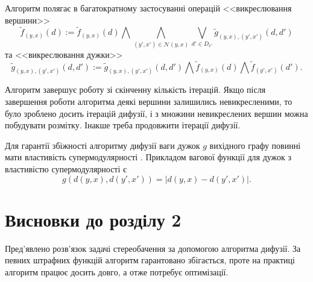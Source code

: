 Алгоритм полягає в багатократному застосуванні операцій
<<викреслювання вершини>>
\begin{equation*}
    \tilde{f}_{\left(y, x \right)} \left(d \right)
    := \tilde{f}_{\left(y, x \right)} \left(d \right)
    \bigwedge \bigwedge \limits_{\left(y', x' \right)\in \mathcal{N}\left(y,x \right)}
        \bigvee \limits_{d' \in D_{x'}}
            \tilde{g}_{\left(y,x \right), \left(y', x' \right)}
                \left(d, d' \right)
\end{equation*}
та <<викреслювання дужки>>
\begin{equation*}
    \tilde{g}_{\left(y,x \right), \left(y', x' \right)} \left(d, d' \right)
    := \tilde{g}_{\left(y,x \right), \left(y', x' \right)} \left(d, d' \right)
    \bigwedge \tilde{f}_{\left(y, x \right)} \left(d \right)
    \bigwedge \tilde{f}_{\left(y', x' \right)} \left(d' \right).
\end{equation*}


Алгоритм завершує роботу зі скінченну кількість ітерацій.
Якщо після завершення роботи алгоритма деякі вершини залишились невикресленими,
то було зроблено досить ітерацій дифузії,
і з множини невикреслених вершин можна побудувати розмітку.
Інакше треба продовжити ітерації дифузії.


Для гарантії збіжності алгоритму дифузії ваги дужок $g$
вихідного графу повинні мати властивість супермодулярності
\cite{diffusion:shlezinger:supermodularity}.
Прикладом вагової функції для дужок з властивістю супермодулярності є
\begin{equation*}
    g \left( d \left( y, x \right), d \left( y', x' \right) \right)
    = \left| d \left( y, x \right) - d \left( y', x' \right) \right|.
\end{equation*}


\section*{Висновки до розділу 2}

Пред'явлено розв'язок задачі стереобачення за допомогою алгоритма дифузії.
За певних штрафних функцій алгоритм гарантовано збігається,
проте на практиці алгоритм працює досить довго, а отже потребує оптимізації.
